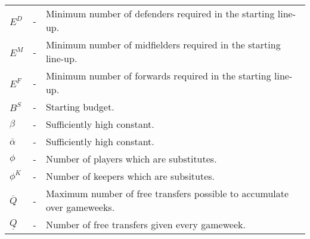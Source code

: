 \begin{table}[H]
\begin{tabular}{@{}lll@{}}
$E^{D}$                          & - & Minimum number of defenders required in the starting line-up.                                     \\
$E^{M}$                          & - & Minimum number of midfielders required in the starting line-up.                                   \\
$E^{F}$                          & - & Minimum number of forwards required in the starting line-up.                                      \\
$B^{S}$                          & - & Starting budget.                                                                               \\
$\beta$                          & - & Sufficiently high constant.                                                                                  \\          
$\bar{\alpha}$                   & - & Sufficiently high constant.                                                                      \\

$\phi$                         & - & Number of players which are substitutes.                                                         \\
$\phi^{K}$                   & - & Number of keepers which are subsitutes.                                                          \\
$\overline{Q}$                   & - & Maximum number of free transfers possible to accumulate over gameweeks.                        \\
$\underline{Q}$                  & - & Number of free transfers given every gameweek.                                                 \\ \bottomrule
\end{tabular}
\end{table}


